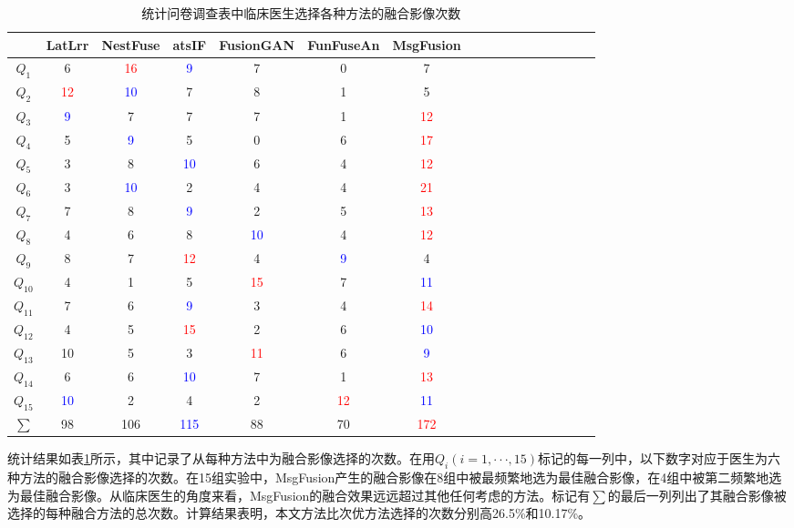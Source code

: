 \begin{table}[htbp]
    \centering
  \caption{统计问卷调查表中临床医生选择各种方法的融合影像次数}\label{paper1Questionnaire}
  \small
\begin{tabular}{ccccccccccccccccc}
\hline
& \textbf{LatLrr} &\textbf{NestFuse} &\textbf{atsIF} &\textbf{FusionGAN} &\textbf{FunFuseAn} &\textbf{MsgFusion}
\\ \hline
 \textbf{$Q_1$} & 6 & \textcolor{red}{16} & \textcolor{blue}{9} & 7 & 0 & 7 \\ 
 \textbf{$Q_2$} & \textcolor{red}{12} &\textcolor{blue}{10} & 7 & 8 & 1 & 5 \\ 
 \textbf{$Q_3$} & \textcolor{blue}{9} & 7 & 7 & 7 & 1 & \textcolor{red}{12} \\ 
 \textbf{$Q_4$} & 5 & \textcolor{blue}{9}  & 5 & 0 & 6 & \textcolor{red}{17} \\ 
 \textbf{$Q_5$} & 3 & 8 & \textcolor{blue}{10} & 6 & 4 & \textcolor{red}{12} \\ 
 \textbf{$Q_6$} & 3 & \textcolor{blue}{10} & 2 & 4 & 4 &{\textcolor{red}{21}} \\ 
 \textbf{$Q_7$} & 7 & 8 & \textcolor{blue}{9} & 2 & 5 & \textcolor{red}{13} \\ 
 \textbf{$Q_8$} & 4 & 6 & 8 & \textcolor{blue}{10} & 4 & \textcolor{red}{12} \\ 
 \textbf{$Q_9$} &8 &7 &\textcolor{red}{12} & 4 &\textcolor{blue}{9} &4 \\ 
 \textbf{$Q_{10}$} &4 &1 &5 &\textcolor{red}{15} &7 &\textcolor{blue}{11} \\ 
 \textbf{$Q_{11}$} &7 &6 &\textcolor{blue}{9} &3 &4 &\textcolor{red}{14} \\ 
 \textbf{$Q_{12}$} &4 &5 &\textcolor{red}{15} &2 &6 &\textcolor{blue}{10} \\ 
 \textbf{$Q_{13}$} &10 &5 &3 &\textcolor{red}{11} &6 &\textcolor{blue}{9} \\ 
 \textbf{$Q_{14}$} &6 &6 &\textcolor{blue}{10}&7 &1 &\textcolor{red}{13} \\ 
 \textbf{$Q_{15}$} &\textcolor{blue}{10} &2 &4 &2 &\textcolor{red}{12} &\textcolor{blue}{11} \\ 
 \textbf{$\sum$} &98 &106 &\textcolor{blue}{115}  &88 &70 &\textcolor{red}{172}
               
\\ \hline
\end{tabular}
\end{table}

统计结果如表\ref{paper1Questionnaire}所示，其中记录了从每种方法中为融合影像选择的次数。在用$Q_i(i=1,\cdot\cdot\cdot,15)$标记的每一列中，以下数字对应于医生为六种方法的融合影像选择的次数。在15组实验中，MsgFusion产生的融合影像在8组中被最频繁地选为最佳融合影像，在4组中被第二频繁地选为最佳融合影像。从临床医生的角度来看，MsgFusion的融合效果远远超过其他任何考虑的方法。标记有$\sum$的最后一列列出了其融合影像被选择的每种融合方法的总次数。计算结果表明，本文方法比次优方法选择的次数分别高26.5\%和10.17\%。

